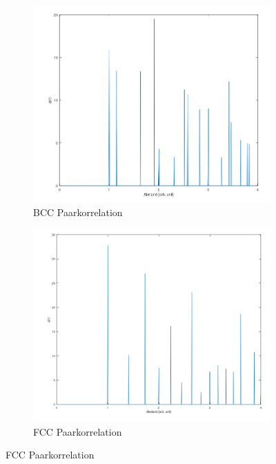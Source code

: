 \documentclass[12pt,a4paper,ngerman]{article}
\begin{document}
\begin{figure}[ht]
	\begin{subfigure}[b]{0.3\textwidth}
	\includegraphics[width=\textwidth]{data/BCC_perfect_paarcorr.png}
	\caption{BCC Paarkorrelation}
	\end{subfigure}
	\hfill %
	\begin{subfigure}[b]{0.3\textwidth}
		\includegraphics[width=\textwidth]{data/FCC_perfect_paarcorr.png}
		\caption{FCC Paarkorrelation}
	\end{subfigure}

\end{figure}
\end{document}
